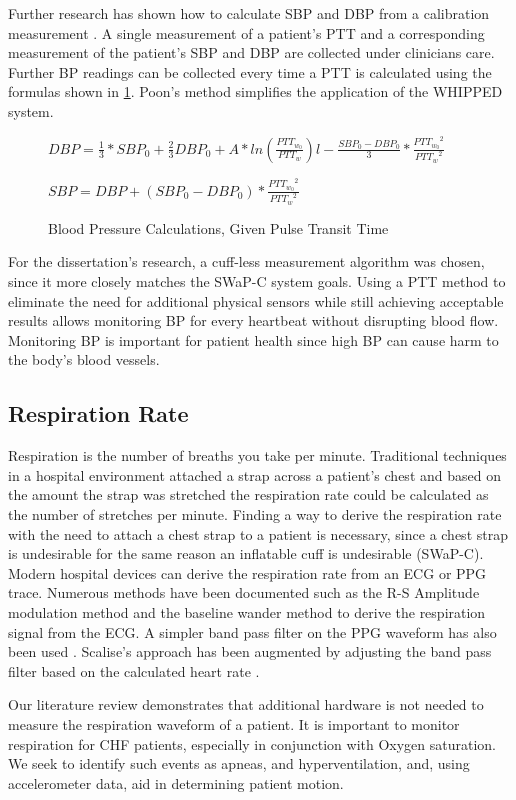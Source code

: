 Further research has shown how to calculate SBP and DBP from a calibration measurement \cite{Poon2005}. A single measurement of a patient's PTT and a corresponding measurement of the patient's SBP and DBP are collected under clinicians care. Further BP readings can be collected every time a PTT is calculated using the formulas shown in \cref{fig:BPCalc}.\cite{Poon2005} Poon's method simplifies the application of the WHIPPED system.

\begin{figure}
	\begin{center}

		\label{fig:BPCalc}
		
		$DBP=\frac{1}{3}*SBP_{0} + \frac{2}{3}DBP_{0} + A*ln(\frac{PTT_{w_{0}}}{PTT_{w}})l-\frac{SBP_{0} - DBP_{0}}{3}*\frac{{PTT_{w_{0}}}^{2}}{{PTT_{w}}^{2}}$
		
		$SBP=DBP+(SBP_{0}-DBP_{0})*\frac{{PTT_{w_{0}}}^2}{{PTT_{w}}^2}$
		\caption{Blood Pressure Calculations, Given Pulse Transit Time }
	\end{center}
\end{figure}

For the dissertation's research, a cuff-less measurement algorithm was chosen, since it more closely matches the SWaP-C system goals. Using a PTT method to eliminate the need for additional physical sensors while still achieving acceptable results allows monitoring BP for every heartbeat without disrupting blood flow. Monitoring BP is important for patient health since high BP can cause harm to the body's blood vessels.

\subsection{Respiration Rate}
\label{subsec:RespirationRate}

Respiration is the number of breaths you take per minute. Traditional techniques in a hospital environment attached a strap across a patient's chest and based on the amount the strap was stretched the respiration rate could be calculated as the number of stretches per minute. Finding a way to derive the respiration rate with the need to attach a chest strap to a patient is necessary, since a chest strap is undesirable for the same reason an inflatable cuff is undesirable (SWaP-C). Modern hospital devices can derive the respiration rate from an ECG or PPG trace. Numerous methods have been documented such as the R-S Amplitude modulation method \cite{Dziuda2011,Noor2011} and the baseline wander method \cite{Scully2012,Ponomarenko2005} to derive the respiration signal from the ECG. A simpler band pass filter on the PPG waveform has also been used \cite{Scalise2011}. Scalise's approach has been augmented by adjusting the band pass filter based on the calculated heart rate \cite{Mason2002}.

Our literature review demonstrates that additional hardware is not needed to measure the respiration waveform of a patient. It is important to monitor respiration for CHF patients, especially in conjunction with Oxygen saturation. We seek to identify such events as apneas, and hyperventilation, and, using accelerometer data, aid in determining patient motion.
